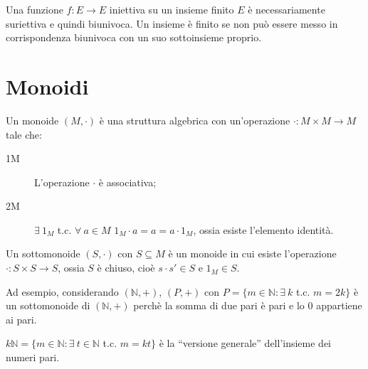 Una funzione $f : E \to E $ iniettiva su un insieme finito $E$ \`e necessariamente suriettiva e quindi biunivoca. Un insieme \`e finito se non pu\`o essere messo in corrispondenza biunivoca con un suo sottoinsieme proprio.






\section{Monoidi}

Un monoide $(M, \cdot)$ \`e una struttura algebrica con un'operazione $\cdot : M \times M \to M$ tale che:
\begin{description}
    \item[1M] L'operazione $\cdot$ \`e associativa;
    \item[2M] $\exists \ 1_M $ t.c. $ \forall \ a \in M$ $ 1_M \cdot a = a = a \cdot 1_M$, ossia esiste l'elemento identit\`a. 
\end{description}

Un sottomonoide $(S, \cdot)$ con $S \subseteq M$ \`e un monoide in cui esiste l'operazione $\cdot : S \times S \to S$, ossia $S$ \`e chiuso, cio\`e $s \cdot s' \in S$ e $1_M \in S$.

Ad esempio, considerando $(\mathbb{N}, +)$, $(P, +)$ con $P = \{ m \in \mathbb{N} : \exists \ k $ t.c. $m = 2k \}$ \`e un sottomonoide di $(\mathbb{N},+)$ perch\`e la somma di due pari \`e pari e lo 0 appartiene ai pari.

$k \mathbb{N} = \{ m \in \mathbb{N} : \exists \ t \in \mathbb{N} $ t.c. $ m = k t\}$ \`e la ``versione generale'' dell'insieme dei numeri pari.

